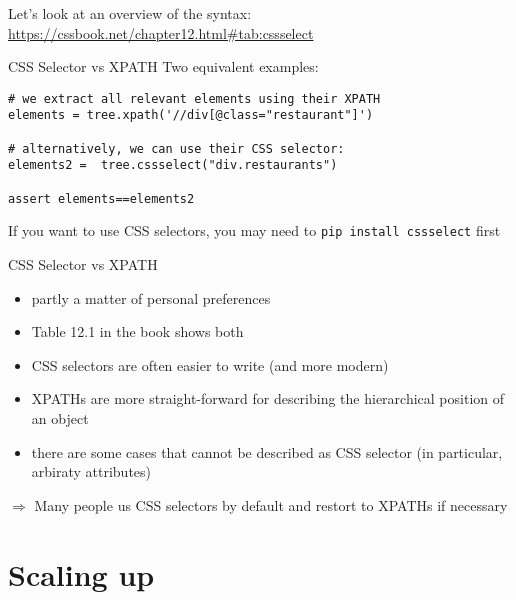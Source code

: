 \begin{frame}[standout]
Let's look at an overview of the syntax: \url{https://cssbook.net/chapter12.html#tab:cssselect}
\end{frame}



\begin{frame}[fragile]{CSS Selector vs XPATH }
Two equivalent examples:
\begin{verbatim}
# we extract all relevant elements using their XPATH
elements = tree.xpath('//div[@class="restaurant"]')

# alternatively, we can use their CSS selector:
elements2 =  tree.cssselect("div.restaurants")

assert elements==elements2
\end{verbatim}

\tiny{If you want to use CSS selectors, you may need to \texttt{pip install cssselect} first}
\end{frame}



\begin{frame}[fragile]{CSS Selector vs XPATH }
\begin{itemize}
	\item partly a matter of personal preferences
	\item Table 12.1 in the book shows both
	\item CSS selectors are often easier to write (and more modern)
	\item XPATHs are more straight-forward for describing the hierarchical position of an object
	\item there are some cases that cannot be described as CSS selector (in particular, arbiraty attributes)
\end{itemize}
$\Rightarrow$ Many people us CSS selectors by default and restort to XPATHs if necessary
\end{frame}













\section{Scaling up}




